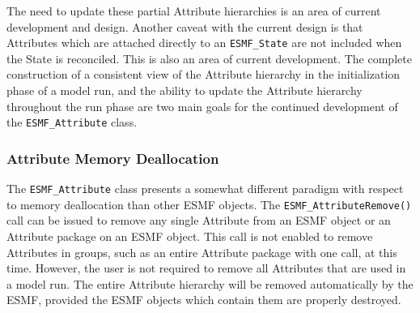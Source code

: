 The need to update these partial Attribute hierarchies is an area of current development and design.  Another caveat with the current design is that Attributes which are attached directly to an {\tt ESMF\_State} are not included when the State is reconciled.  This is also an area of current development.  The complete construction of a consistent view of the Attribute hierarchy in the initialization phase of a model run, and the ability to update the Attribute hierarchy throughout the run phase are two main goals for the continued development of the {\tt ESMF\_Attribute} class.

\subsubsection{Attribute Memory Deallocation}

The {\tt ESMF\_Attribute} class presents a somewhat different paradigm with respect to memory deallocation than other ESMF objects.  The {\tt ESMF\_AttributeRemove()} call can be issued to remove any single Attribute from an ESMF object or an Attribute package on an ESMF object.  This call is not enabled to remove Attributes in groups, such as an entire Attribute package with one call, at this time.  However, the user is not required to remove all Attributes that are used in a model run.  The entire Attribute hierarchy will be removed automatically by the ESMF, provided the ESMF objects which contain them are properly destroyed.  